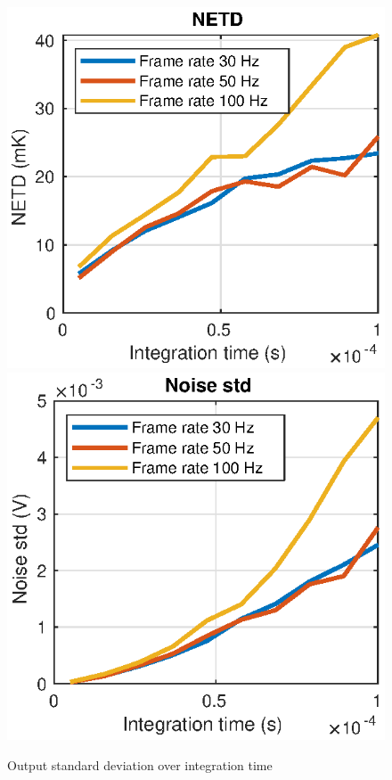 \begin{figure}[H]
 \begin{center}
\includegraphics[scale=0.8]{gfx/NETS_Function_of_Integration_Time.eps}
\includegraphics[scale=0.8]{gfx/STD_Function_of_Integration_Time.eps}
  \caption{Output standard deviation over integration time}
  \label{fig:std_over_time}
  \end{center}
\end{figure}


